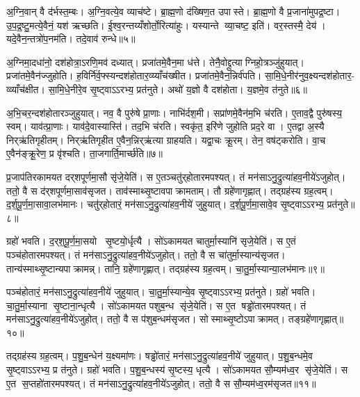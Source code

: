 अ॒ग्नि॒वान् वै द॑र्भस्त॒म्बः। अ॒ग्नि॒वत्ये॒व व्याच॑ष्टे। ब्रा॒ह्म॒णो द॑ख्षिण॒त उपास्ते। ब्रा॒ह्म॒णो वै प्र॒जाना॑मुपद्र॒ष्टा। उ॒प॒द्र॒ष्टु॒मत्ये॒वैनं॒ यश॑ ऋच्छति। ई॒श्व॒रन्तय्यँशोर्तो॒रित्या॑हुः। यस्यान्ते व्या॒चष्ट॒ इति॑। वर॒स्तस्मै॒ देय॑। यदे॒वैन॒न्तत्रो॑प॒नम॑ति। तदे॒वाव॑ रुन्धे॥५॥

अ॒ग्निमा॒दधा॑नो॒ दश॑होत्रा॒ऽरणि॒मव॑ दध्यात्। प्रजा॑तमे॒वैन॒मा ध॑त्ते। तेनै॒वोद्द्रुत्याग्निहो॒त्रञ्जु॑हुयात्। प्रजा॑तमे॒वैन॑ज्जुहोति। ह॒विर्नि॑र्व॒फ्स्यन्दश॑होतार॒व्य्याँच॑ख्षीत। प्रजा॑तमे॒वैन॒न्निर्व॑पति। सा॒मि॒धे॒नीर॑नुव॒क्ष्यन्दश॑होतार॒- व्व्याँच॑क्षीत। सा॒मि॒धे॒नीरे॒व सृ॒ष्ट्वाऽऽरभ्य॒ प्रत॑नुते। अथो॑ य॒ज्ञो वै दश॑होता। य॒ज्ञमे॒व त॑नुते॥६॥

अ॒भि॒चर॒न्दश॑होतारञ्जुहुयात्। नव॒ वै पुरु॑षे प्रा॒णाः। नाभि॑र्दश॒मी। सप्रा॑णमे॒वैन॑म॒भि च॑रति। ए॒ताव॒द्वै पुरु॑षस्य॒ स्वम्। याव॑त्प्रा॒णाः। याव॑दे॒वास्यास्ति॑। तद॒भि च॑रति। स्वकृ॑त॒ इरि॑णे जुहोति प्रद॒रे वा। ए॒तद्वा अ॒स्यै निर्‌ऋ॑तिगृहीतम्। निर्‌ऋ॑तिगृहीत ए॒वैन॒न्निर्‌ऋ॑त्या ग्राहयति। यद्वा॒चः क्रू॒रम्। तेन॒ वष॑ट्करोति। वा॒च ए॒वैन॑ङ्क्रू॒रेण॒ प्र वृ॑श्चति। ता॒जगार्ति॒मार्च्छ॑ति॥७॥\anuvakamend[दश॑होता॒ सृष्ट्या॑ ऋ॒च्छेद्व्याच॑प्टे रुन्ध ए॒व त॑नुते॒ निर्‌ऋ॑तिगृहीतं॒ पञ्च॑ च]

प्र॒जाप॑तिरकामयत दर्‌शपूर्णमा॒सौ सृ॑जे॒येति॑। स ए॒तञ्चतु॑र्‌होतारमपश्यत्। तं मन॑साऽनु॒द्रुत्या॑हव॒नीये॑ऽजुहोत्। ततो॒ वै स द॑र्‌शपूर्णमा॒साव॑सृजत। ताव॑स्माथ्सृ॒ष्टावपाक्रामताम्। तौ ग्रहे॑णागृह्णात्। तद्ग्रह॑स्य ग्रह॒त्वम्। द॒र्श॒पू॒र्ण॒मा॒सावा॒लभ॑मानः। चतु॑र्‌होतारं॒ मन॑साऽनु॒द्रुत्या॑हव॒नीये॑ जुहुयात्। द॒र्श॒पू॒र्ण॒मा॒सावे॒व सृ॒ष्ट्वाऽऽरभ्य॒ प्रत॑नुते॥८॥

ग्रहो॑ भवति। द॒र्‌श॒पू॒र्ण॒मा॒सयो सृ॒ष्टयो॒र्धृत्यै। सो॑ऽकामयत चातुर्मा॒स्यानि॑ सृजे॒येति॑। स ए॒तं पञ्च॑होतारमपश्यत्। तं मन॑साऽनु॒द्रुत्या॑हव॒नीये॑ऽजुहोत्। ततो॒ वै स चा॑तुर्मा॒स्यान्य॑सृजत। तान्य॑स्माथ्सृ॒ष्टान्यपाक्रामन्न्। तानि॒ ग्रहे॑णागृह्णात्। तद्ग्रह॑स्य ग्रह॒त्वम्। चा॒तु॒र्मा॒स्यान्या॒लभ॑मानः॥९॥

पञ्च॑होतारं॒ मन॑साऽनु॒द्रुत्या॑हव॒नीये॑ जुहुयात्। चा॒तु॒र्मा॒स्यान्ये॒व सृ॒ष्ट्वाऽऽरभ्य॒ प्रत॑नुते। ग्रहो॑ भवति। चा॒तु॒र्मा॒स्याना सृ॒ष्टाना॒न्धृत्यै। सो॑ऽकामयत पशुब॒न्ध सृ॑जे॒येति॑। स ए॒त षड्ढो॑तारमपश्यत्। तं मन॑साऽनु॒द्रुत्या॑हव॒नीये॑ऽजुहोत्। ततो॒ वै स प॑शुब॒न्धम॑सृजत। सोस्माथ्सृ॒ष्टोऽपाक्रामत्। तङ्ग्रहे॑णागृह्णात्॥१०॥

तद्ग्रह॑स्य ग्रह॒त्वम्। प॒शु॒ब॒न्धेन॑ य॒क्ष्यमा॑णः। षड्ढो॑तारं॒ मन॑साऽनु॒द्रुत्या॑हव॒नीये॑ जुहुयात्। प॒शु॒ब॒न्धमे॒व सृ॒ष्ट्वाऽऽरभ्य॒ प्र त॑नुते। ग्रहो॑ भवति। प॒शु॒ब॒न्धस्य॑ सृ॒ष्टस्य॒ धृत्यै। सो॑ऽकामयत सौ॒म्यम॑ध्व॒र सृ॑जे॒येति॑। स ए॒त स॒प्तहो॑तारमपश्यत्। तं मन॑साऽनु॒द्रुत्या॑हव॒नीये॑ऽजुहोत्। ततो॒ वै स सौ॒म्यम॑ध्व॒रम॑सृजत॥११॥

